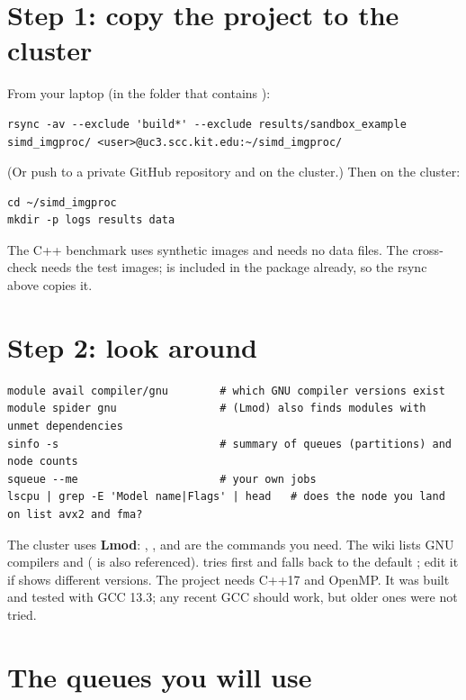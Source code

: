 \section{Step 1: copy the project to the cluster}

From your laptop (in the folder that contains ):
\begin{lstlisting}[style=shell]
rsync -av --exclude 'build*' --exclude results/sandbox_example simd_imgproc/ <user>@uc3.scc.kit.edu:~/simd_imgproc/
\end{lstlisting}
(Or push to a private GitHub repository and  on the cluster.) Then on the cluster:
\begin{lstlisting}[style=shell]
cd ~/simd_imgproc
mkdir -p logs results data
\end{lstlisting}
The C++ benchmark uses synthetic images and needs no data files. The cross-check needs the test images;  is included in the package already, so the rsync above copies it.

\section{Step 2: look around}

\begin{lstlisting}[style=shell]
module avail compiler/gnu        # which GNU compiler versions exist
module spider gnu                # (Lmod) also finds modules with unmet dependencies
sinfo -s                         # summary of queues (partitions) and node counts
squeue --me                      # your own jobs
lscpu | grep -E 'Model name|Flags' | head   # does the node you land on list avx2 and fma?
\end{lstlisting}
The cluster uses \textbf{Lmod}: , ,  and  are the commands you need. The wiki lists GNU compilers  and  ( is also referenced).  tries  first and falls back to the default ; edit it if  shows different versions. The project needs C++17 and OpenMP. It was built and tested with GCC 13.3; any recent GCC should work, but older ones were not tried.

\section{The queues you will use}

